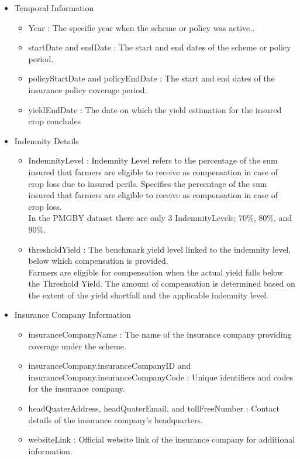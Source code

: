 \documentclass[12pt]{article}
\begin{document}

\begin{itemize}
\item {Temporal Information}
\begin{itemize}
\item{Year : The specific year when the scheme or policy was active..}
\item{startDate and endDate : The start and end dates of the scheme or policy period.}
\item{policyStartDate and policyEndDate : The start and end dates of the insurance policy coverage period.}
\item{yieldEndDate : The date on which the yield estimation for the insured crop concludes}
\end{itemize}
\end{itemize}


\begin{itemize}
\item {Indemnity Details}
\begin{itemize}
\item{IndemnityLevel : Indemnity Level refers to the percentage of the sum insured that farmers are eligible to receive as compensation 
in case of crop loss due to insured perils. Specifies the percentage of the sum insured that farmers are eligible to receive as compensation in case of crop loss.\\
\vspace{5pt}
 In the PMGBY dataset there are only 3 IndemnityLevels; 70\%, 80\%, and 90\%.}
\item{thresholdYield : The benchmark yield level linked to the indemnity level, below which compensation is provided.
\vspace{5pt}\\
Farmers are eligible for compensation when the actual yield falls below the Threshold Yield. The amount of compensation is determined based on the extent of the yield shortfall and the applicable indemnity level.}
\end{itemize}
\end{itemize}


\begin{itemize}
\item {Insurance Company Information}
\begin{itemize}
\item{insuranceCompanyName : The name of the insurance company providing coverage under the scheme.}
\item{insuranceCompany.insuranceCompanyID and insuranceCompany.insuranceCompanyCode : Unique identifiers and codes for the insurance company.}
\item{headQuaterAddress, headQuaterEmail, and tollFreeNumber : Contact details of the insurance company's headquarters.}
\item{websiteLink : Official website link of the insurance company for additional information.}
\end{itemize}
\end{itemize}
\end{document}
